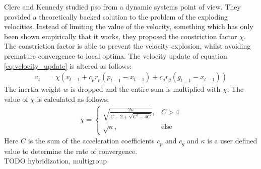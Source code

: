 Clerc and Kennedy \cite{constriction_factor} studied \gls{pso} from a dynamic systems point of view. They provided a theoretically backed solution to the problem of the exploding velocities. Instead of limiting the value of the velocity, something which has only been shown empirically that it works, they proposed the constriction factor $\chi$. The constriction factor is able to prevent the velocity explosion, whilst avoiding premature convergence to local optima. The velocity update of equation \ref{eq:velocity_update} is altered as follows:
\begin{align*}
	v_{t} &= \chi (v_{t-1} + c_pr_p(p_{t-1} - x_{t-1}) + c_gr_g(g_{t-1} - x_{t-1}))
\end{align*}
The inertia weight $w$ is dropped and the entire sum is multiplied with $\chi$. The value of $\chi$ is calculated as follows:
\begin{align*}
	\chi = 
	\begin{cases}
		\sqrt{\frac{2\kappa}{C-2+\sqrt{C^2-4C}}}, &C>4\\
		\sqrt{\kappa}, 							&\text{else}
	\end{cases}
\end{align*}
Here $C$ is the sum of the acceleration coefficients $c_p$ and $c_g$ and $\kappa$ is a user defined value to determine the rate of convergence.\\ 
 
TODO hybridization, multigroup

